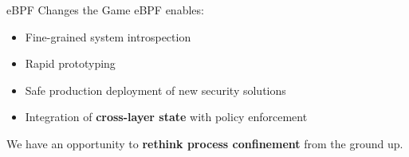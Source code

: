 \documentclass[12pt, dvipsnames]{beamer}
\begin{document}
%
%


\begin{frame}[c]{eBPF Changes the Game}
eBPF enables:
\begin{itemize}
    \item Fine-grained system introspection
    \item Rapid prototyping
    \item Safe production deployment of new security solutions
    \item Integration of \textbf{cross-layer state} with policy enforcement
\end{itemize}
\vfill
We have an opportunity to \textbf{rethink process confinement} from the ground up.
\end{frame}
\end{document}
